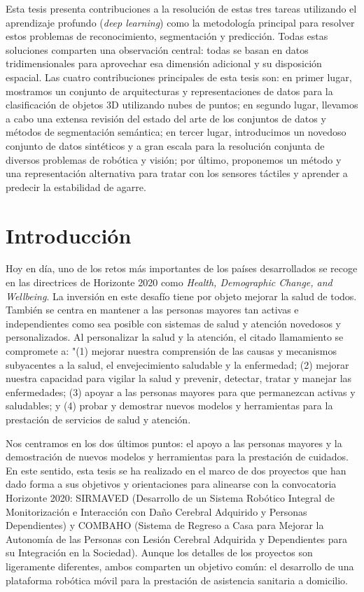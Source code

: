 Esta tesis presenta contribuciones a la resolución de estas tres tareas utilizando el aprendizaje profundo (\emph{deep learning}) como la metodología principal para resolver estos problemas de reconocimiento, segmentación y predicción. Todas estas soluciones comparten una observación central: todas se basan en datos tridimensionales para aprovechar esa dimensión adicional y su disposición espacial. Las cuatro contribuciones principales de esta tesis son: en primer lugar, mostramos un conjunto de arquitecturas y representaciones de datos para la clasificación de objetos 3D utilizando nubes de puntos; en segundo lugar, llevamos a cabo una extensa revisión del estado del arte de los conjuntos de datos y métodos de segmentación semántica; en tercer lugar, introducimos un novedoso conjunto de datos sintéticos y a gran escala para la resolución conjunta de diversos problemas de robótica y visión; por último, proponemos un método y una representación alternativa para tratar con los sensores táctiles y aprender a predecir la estabilidad de agarre.

\section{Introducción}

Hoy en día, uno de los retos más importantes de los países desarrollados se recoge en las directrices de Horizonte 2020 como \emph{Health, Demographic Change, and Wellbeing}. La inversión en este desafío tiene por objeto mejorar la salud de todos. También se centra en mantener a las personas mayores tan activas e independientes como sea posible con sistemas de salud y atención novedosos y personalizados. Al personalizar la salud y la atención, el citado llamamiento se compromete a: "(1) mejorar nuestra comprensión de las causas y mecanismos subyacentes a la salud, el envejecimiento saludable y la enfermedad; (2) mejorar nuestra capacidad para vigilar la salud y prevenir, detectar, tratar y manejar las enfermedades; (3) apoyar a las personas mayores para que permanezcan activas y saludables; y (4) probar y demostrar nuevos modelos y herramientas para la prestación de servicios de salud y atención.

Nos centramos en los dos últimos puntos: el apoyo a las personas mayores y la demostración de nuevos modelos y herramientas para la prestación de cuidados. En este sentido, esta tesis se ha realizado en el marco de dos proyectos que han dado forma a sus objetivos y orientaciones para alinearse con la convocatoria Horizonte 2020: SIRMAVED (Desarrollo de un Sistema Robótico Integral de Monitorización e Interacción con Daño Cerebral Adquirido y Personas Dependientes) y COMBAHO (Sistema de Regreso a Casa para Mejorar la Autonomía de las Personas con Lesión Cerebral Adquirida y Dependientes para su Integración en la Sociedad). Aunque los detalles de los proyectos son ligeramente diferentes, ambos comparten un objetivo común: el desarrollo de una plataforma robótica móvil para la prestación de asistencia sanitaria a domicilio.

